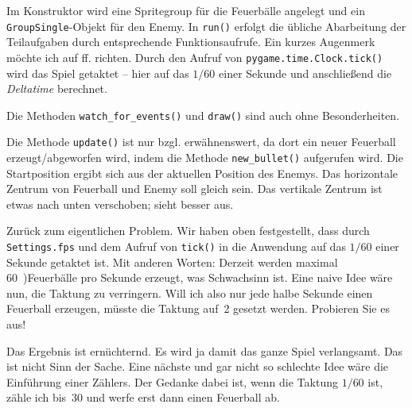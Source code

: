 
Im Konstruktor wird eine Spritegroup für die Feuerbälle angelegt und ein \texttt{GroupSingle}-Objekt für den Enemy. In \texttt{run()} erfolgt die übliche Abarbeitung der Teilaufgaben durch entsprechende Funktionsaufrufe. Ein kurzes Augenmerk möchte ich auf ff. richten. Durch den Aufruf von \texttt{pygame.time.Clock.tick()} wird das Spiel getaktet -- hier auf das $1/60$ einer Sekunde und anschließend die \emph{Deltatime} berechnet. 


Die Methoden \texttt{watch\_for\_events()} und \texttt{draw()} sind auch ohne Besonderheiten.


Die Methode \texttt{update()} ist nur bzgl.  erwähnenswert, da dort ein neuer Feuerball erzeugt/abgeworfen wird, indem die Methode \texttt{new\_bullet()} aufgerufen wird. Die Startposition ergibt sich aus der aktuellen Position des Enemys. Das horizontale Zentrum von Feuerball und Enemy soll gleich sein. Das vertikale Zentrum ist etwas nach unten verschoben; sieht besser aus. 



Zurück zum eigentlichen Problem. Wir haben oben festgestellt, dass durch \texttt{Settings.fps} und dem Aufruf von \texttt{tick()} in  die Anwendung auf das $1/60$ einer Sekunde getaktet ist. Mit anderen Worten: Derzeit werden maximal 60~)Feuerbälle pro Sekunde erzeugt, was Schwachsinn ist. Eine naive Idee wäre nun, die Taktung zu verringern. Will ich also nur jede halbe Sekunde einen Feuerball erzeugen, müsste die Taktung auf~2 gesetzt werden. Probieren Sie es aus!

Das Ergebnis ist ernüchternd. Es wird ja damit das ganze Spiel verlangsamt. Das ist nicht Sinn der Sache. Eine nächste und gar nicht so schlechte Idee wäre die Einführung einer Zählers. Der Gedanke dabei ist, wenn die Taktung $1/60$ ist, zähle ich bis~30 und werfe erst dann einen Feuerball ab. 

